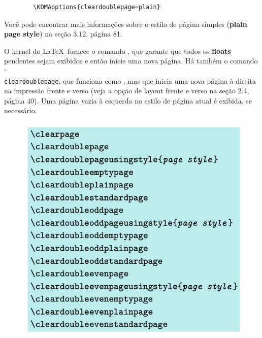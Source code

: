 \begin{verbatim}
        \KOMAoptions{cleardoublepage=plain}
\end{verbatim}

Você pode encontrar mais informações sobre o estilo de página simples (\textbf{plain page style}) na seção 3.12, página 81.

O kernel do \LaTeX\ fornece o comando , que garante que todos os \textbf{floats} pendentes sejam exibidos e então inicie uma nova página. Há também o comando \char`\\\texttt{clear\-dou\-ble\-pa\-ge}, que funciona como , mas que inicia uma nova página à direita na impressão frente e verso (veja a opção de layout frente e verso na seção 2.4, página 40). Uma página vazia à esquerda no estilo de página atual é exibida, se necessário.

\begin{figure}[hb]
    \centering
    \includegraphics[width=0.75\linewidth]{imagens/imagem16.png}
    \label{fig:img16}
\end{figure}


    
